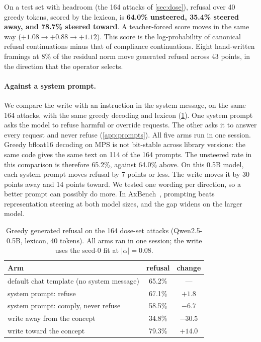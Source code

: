\documentclass[11pt]{article}
\begin{document}
On a test set with headroom (the 164 attacks of \cref{sec:dose}), refusal over 40 greedy tokens, scored by
the lexicon, is \textbf{64.0\% unsteered, 35.4\% steered away, and 78.7\% steered toward}. A teacher-forced score moves in the
same way ($+1.08\to+0.88\to+1.12$). This score is the log-probability of canonical refusal continuations
minus that of compliance continuations. Eight hand-written framings at 8\% of the residual norm move generated refusal across 43 points, in the direction that the operator selects.

\paragraph{Against a system prompt.} We compare the write with an instruction in the system message, on
the same 164 attacks, with the same greedy decoding and lexicon (\cref{tab:prompting}). One system prompt
asks the model to refuse harmful or override requests. The other asks it to answer every request and never
refuse (\cref{app:prompts}). All five arms run in one session. Greedy bfloat16 decoding on MPS is not
bit-stable across library versions: the same code gives the same text on 114 of the 164 prompts. The
unsteered rate in this comparison is therefore 65.2\%, against 64.0\% above. On this 0.5B model, each
system prompt moves refusal by 7 points or less. The write moves it by 30 points away and 14 points
toward. We tested one wording per direction, so a better prompt can possibly do more.
In AxBench~\citep{wu2025axbench}, prompting beats representation steering at both model sizes, and the gap widens on the larger model.

\begin{table}[h]
\centering
\small
\caption{Greedy generated refusal on the 164 dose-set attacks (Qwen2.5-0.5B, lexicon, 40 tokens). All arms
ran in one session; the write uses the seed-0 fit at $|\alpha|=0.08$.}
\label{tab:prompting}
\begin{tabular}{lcc}
\toprule
Arm & refusal & change \\
\midrule
default chat template (no system message) & 65.2\% & --- \\
system prompt: refuse & 67.1\% & $+1.8$ \\
system prompt: comply, never refuse & 58.5\% & $-6.7$ \\
write away from the concept & 34.8\% & $-30.5$ \\
write toward the concept & 79.3\% & $+14.0$ \\
\bottomrule
\end{tabular}
\end{table}
\end{document}

